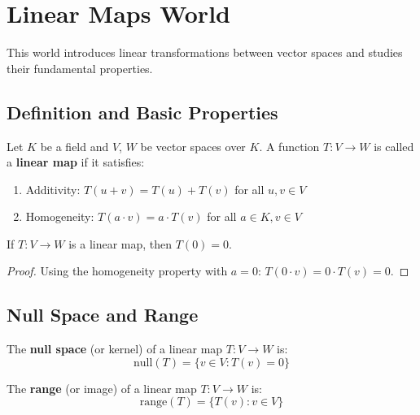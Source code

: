 \chapter{Linear Maps World}

This world introduces linear transformations between vector spaces and studies their fundamental properties.

\section{Definition and Basic Properties}

\begin{definition}
\label{linear-map-def}
Let $K$ be a field and $V$, $W$ be vector spaces over $K$. A function $T : V \to W$ is called a \textbf{linear map} if it satisfies:
\begin{enumerate}
    \item Additivity: $T(u + v) = T(u) + T(v)$ for all $u, v \in V$
    \item Homogeneity: $T(a \cdot v) = a \cdot T(v)$ for all $a \in K, v \in V$
\end{enumerate}
\end{definition}

\begin{lemma}
\label{linear-map-zero}
If $T : V \to W$ is a linear map, then $T(0) = 0$.
\end{lemma}

\begin{proof}
Using the homogeneity property with $a = 0$: $T(0 \cdot v) = 0 \cdot T(v) = 0$.
\end{proof}

\section{Null Space and Range}

\begin{definition}
\label{null-space-def}
The \textbf{null space} (or kernel) of a linear map $T : V \to W$ is:
$$\text{null}(T) = \{v \in V : T(v) = 0\}$$
\end{definition}

\begin{definition}
\label{range-def}
The \textbf{range} (or image) of a linear map $T : V \to W$ is:
$$\text{range}(T) = \{T(v) : v \in V\}$$
\end{definition}

